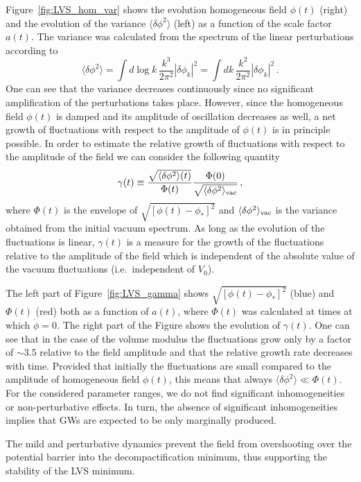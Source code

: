 \documentclass[12pt]{article}
\newcommand{\be}{\begin{equation}}
\newcommand{\ee}{\end{equation}}
\begin{document}
Figure~\ref{fig:LVS_hom_var} shows the evolution homogeneous field $\phi(t)$ (right) and the evolution of the variance $\langle\delta\phi^2\rangle$ (left) as a function of the scale factor $a(t)$. The variance was calculated from the spectrum of the linear perturbations according to
\be
\langle \delta\phi^2\rangle = \int d\log k\,\frac{k^3}{2\pi^2}|\delta\phi_k|^2 = \int dk\,\frac{k^2}{2\pi^2}|\delta\phi_k|^2\,.
\ee
One can see that the variance decreases continuously since no significant amplification of the perturbations takes place. However, since the homogeneous field $\phi(t)$ is damped and its amplitude of oscillation decreases as well, a net growth of fluctuations with respect to the amplitude of $\phi(t)$ is in principle possible. In order to estimate the relative growth of fluctuations with respect to the amplitude of the field we can consider the following quantity
\be
\gamma(t) \equiv \frac{\sqrt{\langle\delta\phi^2\rangle(t)}}{\Phi(t)}\frac{\Phi(0)}{\sqrt{\langle\delta\phi^2\rangle_{\rm vac}}}\,,
\label{eq:def_gamma}
\ee
where $\Phi(t)$ is the envelope of $\sqrt{[\phi(t)-\phi_*]^2}$ and $\langle\delta\phi^2\rangle_{\rm vac}$ is the variance obtained from the initial vacuum spectrum. As long as the evolution of the fluctuations is linear, $\gamma(t)$ is a measure for the growth of the fluctuations relative to the amplitude of the field which is independent of the absolute value of the vacuum fluctuations (i.e.\ independent of $V_0$).

The left part of Figure~\ref{fig:LVS_gamma} shows $\sqrt{[\phi(t)-\phi_*]^2}$ (blue) and $\Phi(t)$ (red) both as a function of $a(t)$, where $\Phi(t)$ was calculated at times at which $\dot{\phi}=0$. The right part of the Figure shows the evolution of $\gamma(t)$. One can see that in the case of the volume modulus the fluctuations grow only by a factor of $\sim3.5$ relative to the field amplitude and that the relative growth rate decreases with time. Provided that initially the fluctuations are small compared to the amplitude of homogeneous field $\phi(t)$, this means that always $\langle\delta\phi^2\rangle \ll\Phi(t)$. For the considered parameter ranges, we do not find significant inhomogeneities or non-perturbative effects. In turn, the absence of significant inhomogeneities implies that GWs are expected to be only marginally produced. 


The mild and perturbative dynamics prevent the field from overshooting over the potential barrier into the decompactification minimum, thus supporting the stability of the LVS minimum. 
\end{document}
